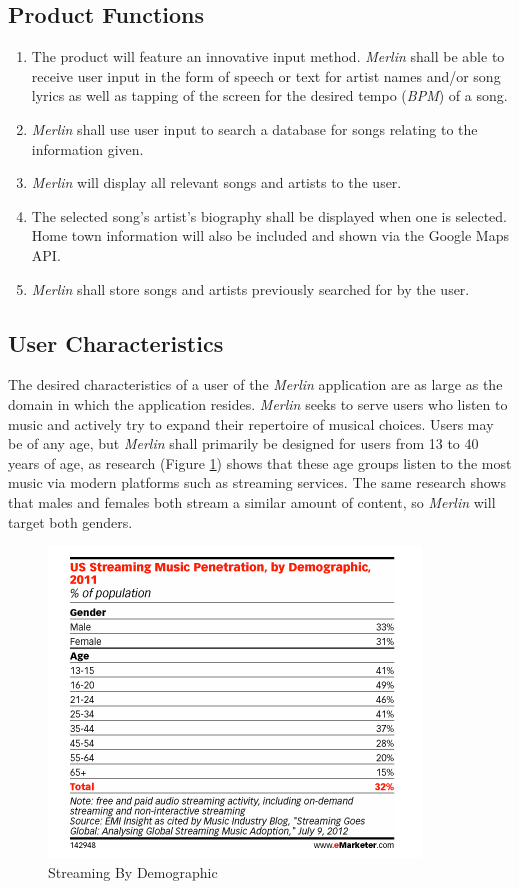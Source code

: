 \documentclass[]{article}
\newcommand{\merlin}{\textit{Merlin }}
\begin{document}
\subsection{Product Functions}
\label{sub:product_functions}
\begin{enumerate}
	\item The product will feature an innovative input method. \merlin shall be able to receive user input in the form of speech or text for artist names and/or song lyrics as well as tapping of the screen for the desired tempo (\textit{BPM}) of a song.
	\item \merlin shall use user input to search a database for songs relating to the information given.
	\item \merlin will display all relevant songs and artists to the user.
	\item The selected song's artist’s biography shall be displayed when one is selected. Home town information will also be included and shown via the Google Maps API.
	\item \merlin shall store songs and artists previously searched for by the user.
\end{enumerate}

\subsection{User Characteristics}
\label{sub:user_characteristics}
	The desired characteristics of a user of the \merlin application are as large as the domain in which the application resides. \merlin seeks to serve users who listen to music and actively try to expand their repertoire of musical choices. Users may be of any age, but \merlin shall primarily be designed for users from 13 to 40 years of age, as research (Figure \ref{fig:streaming_demographics}) shows that these age groups listen to the most music via modern platforms such as streaming services. The same research shows that males and females both stream a similar amount of content, so \merlin will target both genders.
\begin{figure}[!ht]
	\centering
	\includegraphics[scale=0.5]{StreamingByDemographic.png}
	\caption{Streaming By Demographic}
	\label{fig:streaming_demographics}
\end{figure}
\end{document}
